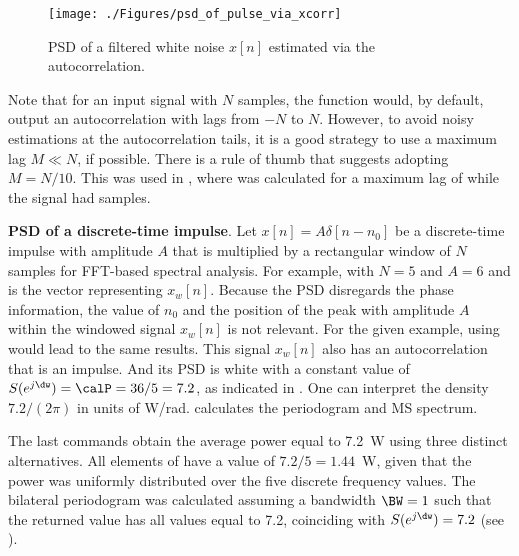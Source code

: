 \begin{figure}[htbp]
\centering
\texttt{[image: ./Figures/psd\_of\_pulse\_via\_xcorr]}
\caption{PSD of a filtered white noise $x[n]$ estimated via the autocorrelation.\label{fig:psd_of_pulse_via_xcorr}}
\end{figure}


Note that for an input signal with $N$ samples, the function  would, by default, output an autocorrelation with lags from $-N$ to $N$. 
However, to avoid noisy estimations at the autocorrelation tails, it is a good strategy to use a maximum lag $M \ll N$, if possible. There is a rule of thumb that suggests adopting $M = N/10$. This was used in , where  was calculated for a maximum lag of  while the signal had  samples.
\eExample 

\bExample \textbf{PSD of a discrete-time impulse}.
\label{ex:psdOfImpulse}
Let $x[n]= A \delta[n-n_0]$ be a discrete-time impulse with amplitude $A$ that is
multiplied by a rectangular window of $N$ samples for FFT-based spectral analysis. 
For example, with $N=5$ and $A=6$ and  is the vector representing $x_w[n]$. 
Because the PSD disregards the phase information, the value of $n_0$ and the position of the peak with amplitude $A$ within the windowed signal $x_w[n]$ is not relevant. For the given example, using  would lead to the same results.
This signal $x_w[n]$ also has an autocorrelation that is an impulse. And its PSD is white with a constant  value of $S(e^{j \dw})=\calP=36/5=7.2$, as indicated in . One can interpret the
density $7.2/(2 \pi)$ in units of W/rad.
 calculates the periodogram and MS spectrum.


The last commands obtain the average power equal to 7.2~W using three distinct alternatives. All elements of  have a value of $7.2/5=1.44$~W, given that the power was uniformly distributed over the five discrete frequency values. The bilateral periodogram was calculated assuming a bandwidth $\BW=1$ such that the returned value has all values equal to 7.2, coinciding with $S(e^{j \dw})=7.2$ (see ).
\eExample


